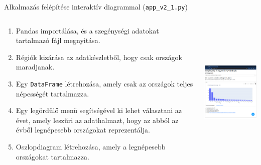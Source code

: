 \documentclass[english, aspectratio=169]{beamer}
\begin{document}
\begin{frame}{Alkalmazás felépítése interaktív diagrammal (\texttt{app\_v2\_1.py})}
	\begin{columns}
		\begin{column}{.5\textwidth}
			\begin{enumerate}
				\item Pandas importálása, és a szegénységi adatokat tartalmazó fájl megnyitása. 
				\item Régiók kizárása az adatkészletből, hogy csak országok maradjanak.
				\item Egy \texttt{DataFrame} létrehozása, amely csak az országok teljes népességét tartalmazza. 
				\item Egy legördülő menü segítségével ki lehet választani az évet, amely leszűri az adathalmazt, hogy az abból az évből legnépesebb országokat reprezentálja.
				\item Oszlopdiagram létrehozása, amely a legnépesebb országokat tartalmazza. 
			\end{enumerate}
		\end{column}
		\begin{column}{.5\textwidth}
			\begin{center}
				\includegraphics[width=7cm, height=7cm, keepaspectratio]{images/plots_5.png}
			\end{center}
		\end{column}
	\end{columns}
\end{frame}
\end{document}

